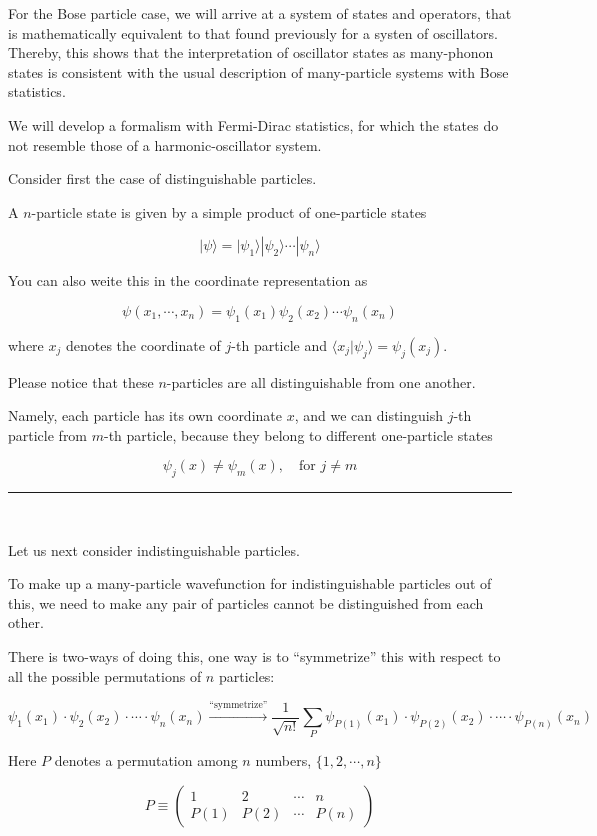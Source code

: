 For the Bose particle case, we will arrive at a system of states and operators, that is mathematically equivalent to that found previously for a systen of oscillators. Thereby, this shows that the interpretation of oscillator states as many-phonon states is consistent with the usual description of many-particle systems with Bose statistics. 

We will develop a formalism with Fermi-Dirac statistics, for which the states do not resemble those of a harmonic-oscillator system. 

Consider first the case of distinguishable particles. 

A $n$-particle state is given by a simple product of one-particle states

\[|\psi\rangle = |\psi_1\rangle|\psi_2\rangle\cdots|\psi_n\rangle \]

You can also weite this in the coordinate representation as 

\[\psi(x_1,\cdots,x_n) = \psi_1(x_1)\psi_2(x_2)\cdots\psi_n(x_n) \]

where $x_j$ denotes the coordinate of $j$-th particle and $\langle x_j|\psi_j\rangle = \psi_j(x_j)$. 

Please notice that these $n$-particles are all distinguishable from one another. 

Namely, each particle has its own coordinate $x$, and we can distinguish $j$-th particle from $m$-th particle, because they belong to different one-particle states

\[\psi_j(x) \neq \psi_m(x),\quad \text{for }j\neq m \]

\hrule

\ 

Let us next consider indistinguishable particles. 

To make up a many-particle wavefunction for indistinguishable particles out of this, we need to make any pair of particles cannot be distinguished from each other. 

There is two-ways of doing this, one way is to ``symmetrize'' this with respect to all the possible permutations of $n$ particles:

\[\psi_1(x_1)\cdot\psi_2(x_2)\cdot\cdots\cdot\psi_n(x_n)\overset{\text{``symmetrize''}}{\longrightarrow}\frac{1}{\sqrt{n!}}\sum_P \psi_{P(1)}(x_1)\cdot\psi_{P(2)}(x_2)\cdot\cdots\cdot\psi_{P(n)}(x_n) \]

Here $P$ denotes a permutation among $n$ numbers, $\{1,2,\cdots,n\}$

\[P \equiv\left(
\begin{matrix}
1 & 2 & \cdots & n\\
P(1) & P(2) & \cdots & P(n)
\end{matrix}
\right) \]

